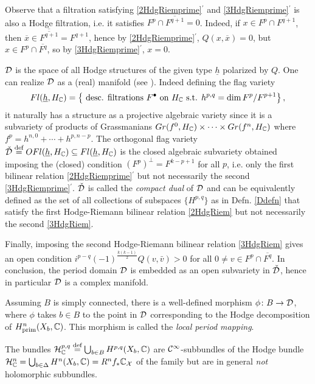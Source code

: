 \documentclass[../main.tex]{subfiles}
\begin{document}
Observe that a filtration satisfying  \eqref{2HdgRiemprime}$^\prime$ and \eqref{3HdgRiemprime}$^\prime$ is also a Hodge filtration, i.e. it satisfies $F^p \cap \overline{F^{q+1}} = 0$. Indeed, if $x \in F^p  \cap \overline{F^{q+1}} $, then $\overline{x} \in \overline{ \overline{F^{q+1}}} = F^{q+1}$, hence by \eqref{2HdgRiemprime}$^\prime$, $Q(x,\overline{x})=0 $, but $x \in F^p \cap \overline{F^{q}} $, so by \eqref{3HdgRiemprime}$^\prime$, $x=0$.

$\mathcal{D}$ is the space of all Hodge structures of the given type  $\underline{h}$ polarized by $Q$. One can realize $\mathcal{D}$ as a (real) manifold (see \cite[Sect. 4.3]{CMSP03}). Indeed defining the flag variety
\[
Fl(\underline{h}, H_{\mathbb{C}}) = \left\{ \text{ desc. filtrations } F^\bullet \text{ on } H_{\mathbb{C}} \text{ s.t. } h^{p,q} = \dim F^p / F^{p+1} \right\},
\]
it naturally has a structure as a projective algebraic variety since it is a subvariety of products of Grassmanians $Gr(f^0,H_{\mathbb{C}}) \times \cdots \times Gr(f^n,H_{\mathbb{C}})$ where $f^p = h^{n,0} + \cdots + h^{p,n-p} $.
The orthogonal flag variety $\check{\mathcal{D}} \stackrel{\text{def}}{=} OFl(\underline{h},H_{\mathbb{C}}) \subseteq Fl(\underline{h}, H_{\mathbb{C}})$ is the closed algebraic subvariety obtained imposing the (closed) condition $(F^p)^\perp =F^{k-p+1}$ for all $p$, i.e. only the first bilinear relation \eqref{2HdgRiemprime}$^\prime$ but not necessarily the second \eqref{3HdgRiemprime}$^\prime$.  $\check{\mathcal{D}}$ is called the \emph{compact dual} of $\mathcal{D}$ and can be equivalently defined as the set of all collections of subspaces $\{H^{p,q}\}$ as in Defn. \ref{Ddefn} that satisfy the first Hodge-Riemann bilinear relation  \eqref{2HdgRiem} but not necessarily the second  \eqref{3HdgRiem}.


Finally, imposing the second Hodge-Riemann bilinear relation \eqref{3HdgRiem} gives an open condition $i^{p-q}(-1)^{\frac{k(k-1)}{2}} Q(v, \bar v) > 0$ for all $0 \neq v \in F^p \cap \overline{F^q}$.
In conclusion, the period domain $\mathcal{D}$ is embedded as an open subvariety in $\check{\mathcal{D}}$, hence in particular $\mathcal{D}$ is a complex manifold.

Assuming $B$ is simply connected, there is a well-defined morphism $\phi\colon B \to \mathcal{D}$, where $\phi$ takes $b \in B$ to the point in $\mathcal{D}$ corresponding to the Hodge decomposition of $H^n_{\text{prim}}(X_b,\mathbb{C})$. This morphism is called the  \emph{local period mapping}. 

The bundles $\mathcal{H}^{p,q}_{\mathbb{C}} \stackrel{\text{def}}{=}  \bigcup_{b \in B} H^{p,q}(X_b,\mathbb{C}) $ are $\mathcal{C}^\infty$-subbundles of the Hodge bundle $\mathcal{H}^n_{\mathbb{C}} = \bigcup_{b \in \Delta} H^n(X_b,\mathbb{C}) = R^nf_*\mathbb{C}_{\mathcal{X}}$ of the family but are in general \emph{not} holomorphic subbundles.
\end{document}
